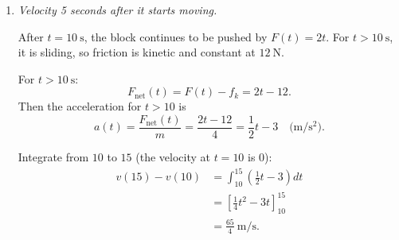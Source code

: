 \documentclass[../main.tex]{subfiles}
\begin{document}
\begin{enumerate}
\begin{enumerate}
    Just after $t = 10~\text{s}$, the block is in motion, so kinetic friction applies with constant magnitude $f_k = 12~\text{N}$ opposing the motion.

    The applied force at $t=10~\text{s}$ is
    \[
    F(10) = 2(10) = 20~\text{N}.
    \]

    Net horizontal force just after motion begins:
    \[
    F_{\text{net}} = F - f_k = 20 - 12 = 8~\text{N}.
    \]

    Newton's second law:
    \[
    a = \frac{F_{\text{net}}}{m}
    = \frac{8}{4}
    = 2~\text{m/s}^2.
    \]

    So the block's initial acceleration (once it breaks free) is $2~\text{m/s}^2$.

    \item \textit{Velocity 5 seconds after it starts moving.}

    After $t=10~\text{s}$, the block continues to be pushed by $F(t)=2t$. For $t>10~\text{s}$, it is sliding, so friction is kinetic and constant at $12~\text{N}$.

    For $t>10~\text{s}$:
    \[
    F_{\text{net}}(t) = F(t) - f_k = 2t - 12.
    \]
    Then the acceleration for $t>10$ is
    \[
    a(t) = \frac{F_{\text{net}}(t)}{m}
    = \frac{2t - 12}{4}
    = \frac{1}{2}t - 3
    \quad \text{(m/s$^2$)}.
    \]

    
    Integrate from $10$ to $15$ (the velocity at $t=10$ is $0$):
    \begin{align*}
    v(15) - v(10)
    &= \int_{10}^{15} \left( \frac{1}{2}t - 3 \right) dt \\
    &= \left[ \frac{1}{4}t^2 -3t \right]_{10}^{15} \\
    &= \frac{65}{4}~\text{m/s}.
    \end{align*}
\end{enumerate}

\end{enumerate}
\end{document}
